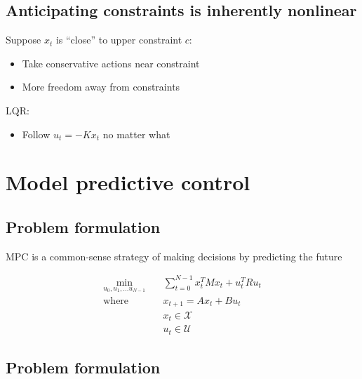 \documentclass[
  letterpaper,
  DIV=11,
  numbers=noendperiod,
  oneside]{scrartcl}
\providecommand{\tightlist}{%
  \setlength{\itemsep}{0pt}\setlength{\parskip}{0pt}}\usepackage{longtable,booktabs,array}
\begin{document}
\subsection{Anticipating constraints is inherently
nonlinear}\label{anticipating-constraints-is-inherently-nonlinear}

Suppose \(x_t\) is ``close'' to upper constraint \(c\):

\begin{itemize}
\tightlist
\item
  Take conservative actions near constraint
\item
  More freedom away from constraints
\end{itemize}

LQR:

\begin{itemize}
\tightlist
\item
  Follow \(u_t = -K x_t\) no matter what
\end{itemize}

\section{Model predictive control}\label{model-predictive-control}

\subsection{Problem formulation}\label{problem-formulation}

MPC is a common-sense strategy of making decisions by predicting the
future

\begin{align}
\min_{u_0, u_1, \ldots u_{N-1}} \quad & \sum_{t=0}^{N-1} x_{t}^{T} M x_t +  u_{t}^{T} R u_t \\
\text{where } \quad & x_{t+1} = A x_t + B u_t \\
& x_t \in \mathcal{X} \\
& u_t \in \mathcal{U}
\end{align}


\subsection{Problem formulation}\label{problem-formulation-1}
\end{document}
